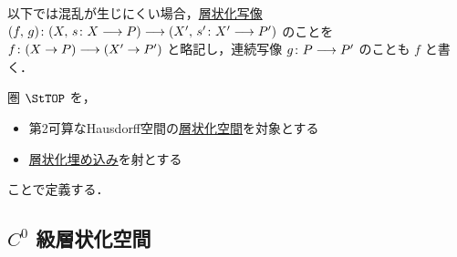 \documentclass[TQFT_main]{subfiles}
\begin{document}
\begin{marker}
    以下では混乱が生じにくい場合，\hyperref[def:stratified-space]{層状化写像} $(f,\, g) \colon (X,\, s \colon X \longrightarrow P) \longrightarrow (X',\, s' \colon X' \longrightarrow P')$ のことを $f \colon (X \to P) \longrightarrow (X' \to P')$ と略記し，連続写像 $g \colon P \longrightarrow P'$ のことも $f$ と書く．
\end{marker}

圏 $\StTOP$ を，
\begin{itemize}
    \item 第2可算なHausdorff空間の\hyperref[def:stratified-space]{層状化空間}を対象とする
    \item \hyperref[def:strat-emb]{層状化埋め込み}を射とする
\end{itemize}
ことで定義する．

\subsection{$C^0$ 級層状化空間}
\end{document}
